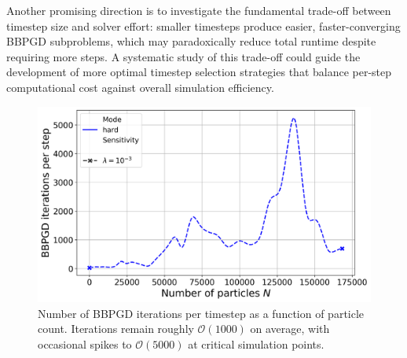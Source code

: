 \documentclass[conference]{IEEEtran}
\begin{document}
Another promising direction is to investigate the fundamental trade-off between timestep size and solver effort: smaller timesteps produce easier, faster-converging BBPGD subproblems, which may paradoxically reduce total runtime despite requiring more steps. A systematic study of this trade-off could guide the development of more optimal timestep selection strategies that balance per-step computational cost against overall simulation efficiency.

\begin{figure}[h]
    \centering
    \includegraphics[width=\linewidth]{figures/comparison_plots/bbpgd_num_particles_vs_bbpgd_steps.png}
    \caption{Number of BBPGD iterations per timestep as a function of particle count. Iterations remain roughly $\mathcal{O}(1000)$ on average, with occasional spikes to $\mathcal{O}(5000)$ at critical simulation points.}
    \label{fig:bbpgd_iterations_per_step_vs_num_particles}
\end{figure}
\end{document}
